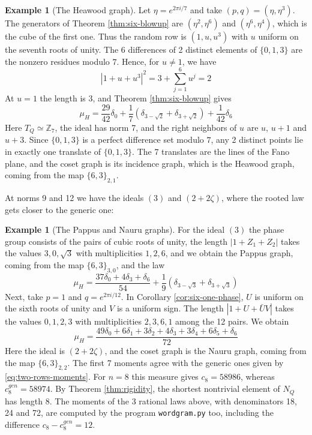 \documentclass[11pt,reqno]{amsart}
\theoremstyle{definition}
\newtheorem{example}[thm]{Example}
\numberwithin{equation}{section}
\begin{document}
\begin{example}[The Heawood graph]
Let $\eta=e^{2\pi i/7}$ and take $(p,q)=(\eta,\eta^3)$. The generators of Theorem \ref{thm:six-blowup} are $(\eta^2,\eta^6)$ and $(\eta^6,\eta^4)$, which is the cube of the first one. Thus the random row is $(1,u,u^3)$ with $u$ uniform on the seventh roots of unity. The 6 differences of 2 distinct elements of $\{0,1,3\}$ are the nonzero residues modulo $7$. Hence, for $u\neq1$, we have
$$|1+u+u^3|^2=3+\sum_{j=1}^6u^j=2$$
At $u=1$ the length is 3, and Theorem \ref{thm:six-blowup} gives
$$\mu_H=\frac{29}{42}\delta_0+\frac17(\delta_{3-\sqrt2}+\delta_{3+\sqrt2})+\frac1{42}\delta_6$$
Here $T_Q\simeq\mathbb Z_7$, the ideal has norm 7, and the right neighbors of $u$ are $u$, $u+1$ and $u+3$. Since $\{0,1,3\}$ is a perfect difference set modulo $7$, any 2 distinct points lie in exactly one translate of $\{0,1,3\}$. The 7 translates are the lines of the Fano plane, and the coset graph is its incidence graph, which is the Heawood graph, coming from the map $\{6,3\}_{2,1}$.
\end{example}

At norms 9 and 12 we have the ideals $(3)$ and $(2+2\zeta)$, where the rooted law gets closer to the generic one:

\begin{example}[The Pappus and Nauru graphs]\label{ex:six-twelfth}
For the ideal $(3)$ the phase group consists of the pairs of cubic roots of unity, the length $|1+Z_1+Z_2|$ takes the values $3,0,\sqrt3$ with multiplicities $1,2,6$, and we obtain the Pappus graph, coming from the map $\{6,3\}_{3,0}$, and the law
$$\mu_H=\frac{37\delta_0+4\delta_3+\delta_6}{54}+\frac19\left(\delta_{3-\sqrt3}+\delta_{3+\sqrt3}\right)$$
Next, take $p=1$ and $q=e^{2\pi i/12}$. In Corollary \ref{cor:six-one-phase}, $U$ is uniform on the sixth roots of unity and $V$ is a uniform sign. The length $|1+U+\bar UV|$ takes the values $0,1,2,3$ with multiplicities $2,3,6,1$ among the 12 pairs. We obtain
$$\mu_H
=\frac{49\delta_0+6\delta_1+3\delta_2+4\delta_3+3\delta_4+6\delta_5+\delta_6}{72}$$
Here the ideal is $(2+2\zeta)$, and the coset graph is the Nauru graph, coming from the map $\{6,3\}_{2,2}$. The first 7 moments agree with the generic ones given by \eqref{eq:two-rows-moments}. For $n=8$ this measure gives $c_8=58986$, whereas $c_8^{gen}=58974$. By Theorem \ref{thm:rigidity}, the shortest nontrivial element of $N_Q$ has length $8$. The moments of the 3 rational laws above, with denominators 18, 24 and 72, are computed by the program \texttt{wordgram.py} too, including the difference $c_8-c_8^{gen}=12$.
\end{example}
\end{document}

